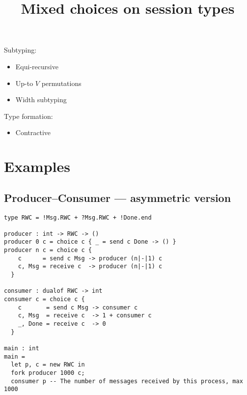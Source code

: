 \documentclass{article}
\title{Mixed choices on session types}
\begin{document}





\noindent
Subtyping:
\begin{itemize}
\item Equi-recursive
\item Up-to $V$ permutations
\item Width subtyping
\end{itemize}







\newpage
\noindent
Type formation:
\begin{itemize}
\item Contractive
\end{itemize}
\newpage
\section{Examples}
\lstset{language=freestMC}
\subsection{Producer--Consumer --- asymmetric version}
  \vspace{2cm}
\begin{lstlisting}
type RWC = !Msg.RWC + ?Msg.RWC + !Done.end
  
producer : int -> RWC -> ()
producer 0 c = choice c { _ = send c Done -> () }
producer n c = choice c {
    c      = send c Msg -> producer (n|-|1) c
    c, Msg = receive c  -> producer (n|-|1) c
  }

consumer : dualof RWC -> int
consumer c = choice c {
    c       = send c Msg -> consumer c
    c, Msg  = receive c  -> 1 + consumer c
    _, Done = receive c  -> 0
  }

main : int
main =
  let p, c = new RWC in 
  fork producer 1000 c;
  consumer p -- The number of messages received by this process, max 1000
\end{lstlisting}
\newpage
\end{document}

